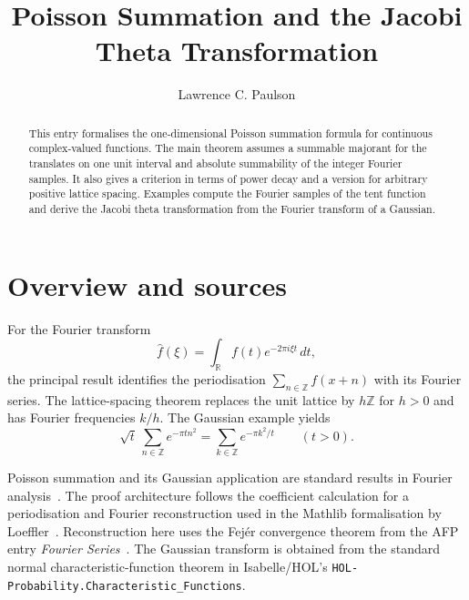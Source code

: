\documentclass[11pt,a4paper]{article}
\begin{document}
\title{Poisson Summation and the Jacobi Theta Transformation}
\author{Lawrence C. Paulson}
\date{}
\maketitle

\begin{abstract}
This entry formalises the one-dimensional Poisson summation formula for
continuous complex-valued functions. The main theorem assumes a summable
majorant for the translates on one unit interval and absolute summability
of the integer Fourier samples. It also gives a criterion in terms of power
decay and a version for arbitrary positive lattice spacing. Examples
compute the Fourier samples of the tent function and derive the Jacobi
theta transformation from the Fourier transform of a Gaussian.
\end{abstract}

\tableofcontents

\section{Overview and sources}

For the Fourier transform
\[
  \widehat f(\xi)=\int_{\mathbb R} f(t)e^{-2\pi i\xi t}\,dt,
\]
the principal result identifies the periodisation
$\sum_{n\in\mathbb Z} f(x+n)$ with its Fourier series. The lattice-spacing
theorem replaces the unit lattice by $h\mathbb Z$ for $h>0$ and has Fourier
frequencies $k/h$. The Gaussian example yields
\[
  \sqrt t\,\sum_{n\in\mathbb Z}e^{-\pi t n^2}
  =\sum_{k\in\mathbb Z}e^{-\pi k^2/t}
  \qquad (t>0).
\]

Poisson summation and its Gaussian application are standard results in
Fourier analysis~\cite{stein_shakarchi_fourier}. The proof architecture
follows the coefficient calculation for a periodisation and Fourier
reconstruction used in the Mathlib formalisation by
Loeffler~\cite{mathlib_poisson}. Reconstruction here uses the Fej\'er
convergence theorem from the AFP entry \emph{Fourier Series}~\cite{afp_fourier}.
The Gaussian transform is obtained from the standard normal
characteristic-function theorem in Isabelle/HOL's
\texttt{HOL-Probability.Characteristic\_Functions}.





\end{document}
